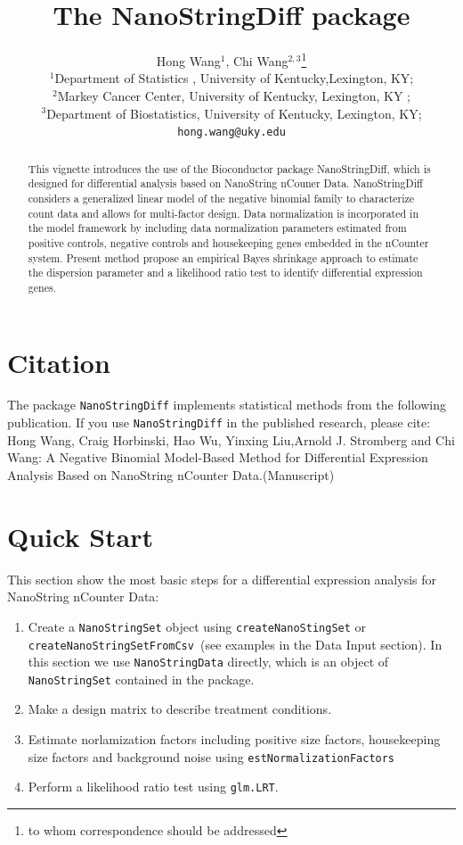 \documentclass[12pt]{article}
\author{Hong Wang$^{1}$, Chi Wang$^{2,3}$\footnote{to whom correspondence 
should be addressed} \\[1em] 
\small{$^{1}$Department of Statistics , University of Kentucky,Lexington, KY;}\\ 
\small{$^{2}$Markey Cancer Center, University of Kentucky, Lexington, KY ;}\\ 
\small{$^{3}$Department of Biostatistics, University of Kentucky, 
Lexington, KY;}\\ 
\small{\texttt{hong.wang@uky.edu}}}
\title{\textsf{\textbf{The NanoStringDiff package}}}
\begin{document}

\maketitle

\begin{abstract}
This vignette introduces the use of the Bioconductor package 
NanoStringDiff, which is designed for differential analysis based on 
NanoString nCouner Data. NanoStringDiff considers a generalized linear 
model of the negative binomial family to characterize count data and
allows for multi-factor design. Data normalization is incorporated in
the model framework by including data normalization parameters estimated 
from positive controls, negative controls and housekeeping genes embedded 
in the nCounter system. Present method propose an empirical Bayes shrinkage 
approach to estimate the dispersion parameter and a likelihood ratio test 
to identify differential expression genes.



\end{abstract}


\newpage

\tableofcontents

\newpage


\section{Citation}
The package {\tt NanoStringDiff} implements statistical methods from the 
following publication. If you use {\tt NanoStringDiff} in the published 
research, please cite: \\
Hong Wang, Craig Horbinski, Hao Wu, Yinxing Liu,Arnold J. Stromberg 
and Chi Wang: A Negative Binomial Model-Based Method for Differential 
Expression Analysis Based on NanoString nCounter Data.(Manuscript)

\section{Quick Start}
This section show the most basic steps for a differential expression analysis 
for NanoString nCounter Data:
\begin{enumerate}
\item Create a {\tt NanoStringSet} object using {\tt createNanoStingSet} 
      or {\tt createNanoStringSetFromCsv }(see examples in the Data Input section). 
      In this section we use {\tt NanoStringData} directly, which is an object 
      of {\tt NanoStringSet} contained in the package. 
\item Make a design matrix to describe treatment conditions. 
\item Estimate norlamization factors including positive size factors, 
      housekeeping size factors and background noise using 
      {\tt estNormalizationFactors}
\item Perform a likelihood ratio test using {\tt glm.LRT}. 
\end{enumerate}
\end{document}
